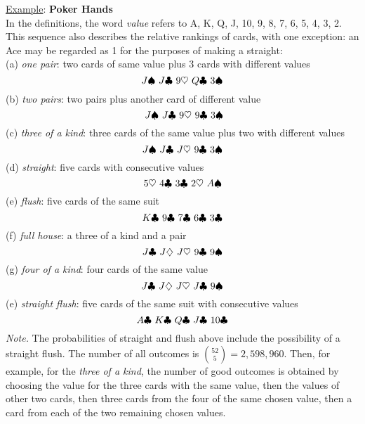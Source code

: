   \underline{Example}: {\bf Poker Hands}\\ 
In the definitions, the word {\it value\/} 
refers to A, K, Q, J, 10, 9, 8, 7, 6, 5, 4, 3, 2.
This sequence also describes the relative rankings 
of cards, with one exception: an Ace may be 
regarded as 1 for the purposes of making a straight:\\ 
(a) {\it one pair\/}: two cards of same value plus 3 cards
with different values 
$$
J\spadesuit\,\, J \clubsuit\,\, 9\heartsuit\,\, Q\clubsuit\,\, 3\spadesuit
$$
(b) {\it two pairs\/}: two pairs plus another card 
of different value
$$
\,\,J\spadesuit\,\, J \clubsuit \,\,9\heartsuit\,\, 9\clubsuit\,\, 3\spadesuit
$$
(c) {\it three of a kind\/}: three cards of the same 
value plus two with different values
$$
J\spadesuit \,\,J \clubsuit\,\, J\heartsuit\,\, 9\clubsuit\,\, 3\spadesuit
$$
(d) {\it straight\/}: five cards with consecutive values
$$
5\heartsuit\,\, 4\clubsuit\,\, 3\clubsuit\,\, 2\heartsuit\,\, A\spadesuit
$$
(e) {\it flush\/}: five cards of the same suit
$$
K\clubsuit\,\, 9\clubsuit\,\, 7\clubsuit\,\, 6\clubsuit\,\, 3\clubsuit
$$
(f) {\it full house\/}: a three of a kind and a pair
$$
J\clubsuit\,\, J\diamondsuit\,\, J\heartsuit\,\, 9\clubsuit\,\, 9\spadesuit
$$
(g) {\it four of a kind\/}: four cards of the same value
$$
J\clubsuit\,\, J\diamondsuit\,\, J\heartsuit\,\, J\clubsuit\,\, 9\spadesuit
$$
(e) {\it straight flush\/}: five cards of the same suit with consecutive values
$$
A\clubsuit\,\, K\clubsuit\,\, Q\clubsuit\,\, J\clubsuit\,\, 10\clubsuit
$$
\vskip0.5cm 
\vskip0.5cm 
{\it Note.} The probabilities of straight and flush above 
include the possibility of a straight flush. The number 
of all outcomes is ${{52}\choose 5}=2,598,960$. 
Then, for example, for the  {\it three of a kind\/}, the number of 
good outcomes is obtained by choosing the value
for the three cards with the same value, then 
the values of other two cards, then three cards 
from the four of the same chosen value, then 
a card from each of the two remaining chosen values.\\\\ 
